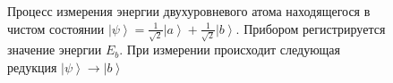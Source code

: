 \begin{figure}
\centering



\caption{Процесс измерения энергии двухуровневого атома находящегося в
чистом состоянии $\left|\psi\right> = 
\frac{1}{\sqrt{2}}\left|a\right> + \frac{1}{\sqrt{2}}\left|b\right>$.
Прибором регистрируется значение энергии $E_b$. При измерении
происходит следующая редукция $\left|\psi\right> \to \left|b\right>$
}
\label{fig:add:mesure_ex_b}
\end{figure}
